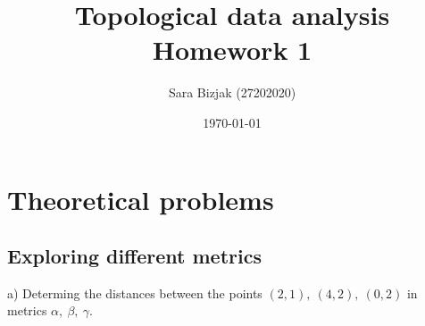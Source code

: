 \documentclass[a4paper,11pt]{article}
\title{Topological data analysis \\ Homework 1}
\author{Sara Bizjak (27202020)}
\date{\today}
\begin{document}
\maketitle

\section{Theoretical problems}
\subsection{Exploring different metrics}


a) Determing the distances between the points $(2, 1), \ (4, 2), \ (0, 2)$ in metrics $\alpha, \  \beta, \ \gamma$.
\end{document}
